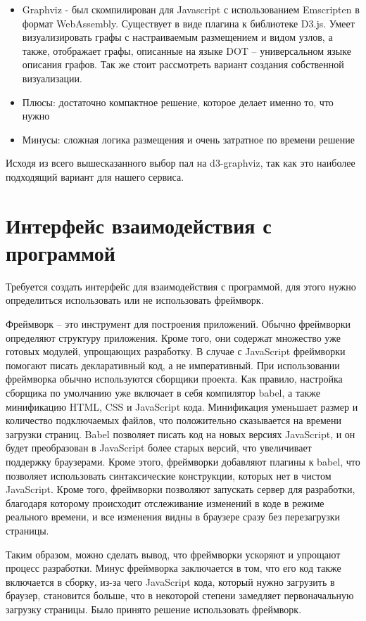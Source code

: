 \begin{itemize}
\item Graphviz - был скомпилирован для Javascript с использованием Emscripten в формат WebAssembly. Существует в виде плагина к библиотеке D3.js. Умеет визуализировать графы с настраиваемым размещением и видом узлов, а также, отображает графы, описанные на языке DOT – универсальном языке описания графов.
Так же стоит рассмотреть вариант создания собственной визуализации.
\item Плюсы: достаточно компактное решение, которое делает именно то, что нужно
\item Минусы: сложная логика размещения и очень затратное по времени решение
\end{itemize}

Исходя из всего вышесказанного выбор пал на d3-graphviz, так как это наиболее подходящий вариант для нашего сервиса.
\section{Интерфейс взаимодействия с программой} \label{ch4:sec4}
Требуется создать интерфейс для взаимодействия с программой, для этого нужно определиться использовать или не использовать фреймворк.

Фреймворк – это инструмент для построения приложений. Обычно фреймворки определяют структуру приложения. Кроме того, они содержат множество уже готовых модулей, упрощающих разработку. В случае с JavaScript фреймворки помогают писать декларативный код, а не императивный. При использовании фреймворка обычно используются сборщики проекта. Как правило, настройка сборщика по умолчанию уже включает в себя компилятор babel, а также минификацию HTML, CSS и JavaScript кода. Минификация уменьшает размер и количество подключаемых файлов, что положительно сказывается на времени загрузки страниц. Babel позволяет писать код на новых версиях JavaScript, и он будет преобразован в JavaScript более старых версий, что увеличивает поддержку браузерами. Кроме этого, фреймворки добавляют плагины к babel, что позволяет использовать синтаксические конструкции, которых нет в чистом JavaScript. Кроме того, фреймворки позволяют запускать сервер для разработки, благодаря которому происходит отслеживание изменений в коде в режиме реального времени, и все изменения видны в браузере сразу без перезагрузки страницы.

Таким образом, можно сделать вывод, что фреймворки ускоряют и упрощают процесс разработки. Минус фреймворка заключается в том, что его код также включается в сборку, из-за чего JavaScript кода, который нужно загрузить в браузер, становится больше, что в некоторой степени замедляет первоначальную загрузку страницы. Было принято решение использовать фреймворк.
